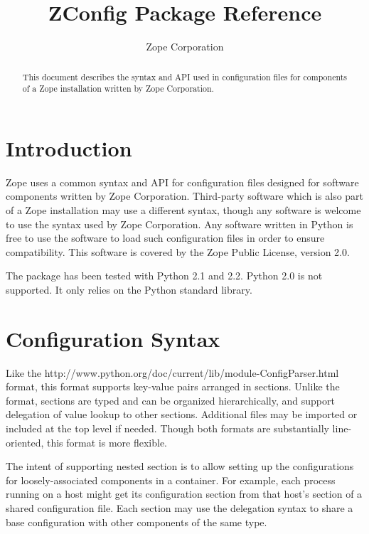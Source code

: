 \documentclass{howto}
\title{ZConfig Package Reference}
\author{Zope Corporation}
\begin{document}
\maketitle

\begin{abstract}
\noindent
This document describes the syntax and API used in configuration files
for components of a Zope installation written by Zope Corporation.
\end{abstract}

\tableofcontents


\section{Introduction \label{intro}}

Zope uses a common syntax and API for configuration files designed for
software components written by Zope Corporation.  Third-party software
which is also part of a Zope installation may use a different syntax,
though any software is welcome to use the syntax used by Zope
Corporation.  Any software written in Python is free to use the
 software to load such configuration files in order to
ensure compatibility.  This software is covered by the Zope Public
License, version 2.0.

The  package has been tested with Python 2.1 and 2.2.
Python 2.0 is not supported.
It only relies on the Python standard library.


\section{Configuration Syntax \label{syntax}}

Like the 
{http://www.python.org/doc/current/lib/module-ConfigParser.html}
format, this format supports key-value pairs arranged in sections.
Unlike the  format, sections are typed and can be
organized hierarchically, and support delegation of value lookup to
other sections.  Additional files may be imported or included at the
top level if needed.  Though both formats are substantially
line-oriented, this format is more flexible.

The intent of supporting nested section is to allow setting up the
configurations for loosely-associated components in a container.  For
example, each process running on a host might get its configuration
section from that host's section of a shared configuration file.  Each
section may use the delegation syntax to share a base configuration
with other components of the same type.
\end{document}
